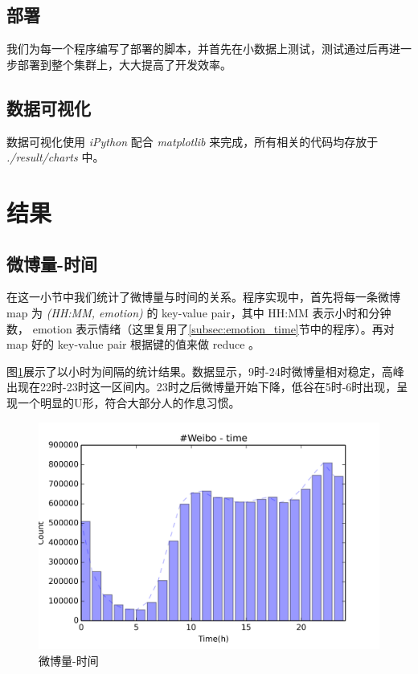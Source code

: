 \documentclass[12pt, oneside]{article}
\begin{document}
\begin{spacing}{1.5}
\begin{CJK}{UTF8}{gbsn}
\subsection{部署}
我们为每一个程序编写了部署的脚本，并首先在小数据上测试，测试通过后再进一步部署到整个集群上，大大提高了开发效率。

\subsection{数据可视化}
数据可视化使用 {\it iPython} 配合 {\it matplotlib} 来完成，所有相关的代码均存放于 {\it ./result/charts} 中。

\newpage

\section{结果}
\subsection{微博量-时间}
\label{subsec:weibo_time}
在这一小节中我们统计了微博量与时间的关系。程序实现中，首先将每一条微博 map 为 {\it(HH:MM, emotion)} 的 key-value pair，其中 HH:MM 表示小时和分钟数， emotion 表示情绪（这里复用了\ref{subsec:emotion_time}节中的程序）。再对 map 好的 key-value pair 根据键的值来做 reduce 。

图\ref{fig:weibo_time}展示了以小时为间隔的统计结果。数据显示，9时-24时微博量相对稳定，高峰出现在22时-23时这一区间内。23时之后微博量开始下降，低谷在5时-6时出现，呈现一个明显的U形，符合大部分人的作息习惯。

\begin{figure}
	\centering
	\includegraphics[width=0.8\linewidth]{../result/charts/weibo_time}
	\caption{微博量-时间}
	\label{fig:weibo_time}
\end{figure}


\end{CJK}
\end{spacing}
\end{document}

